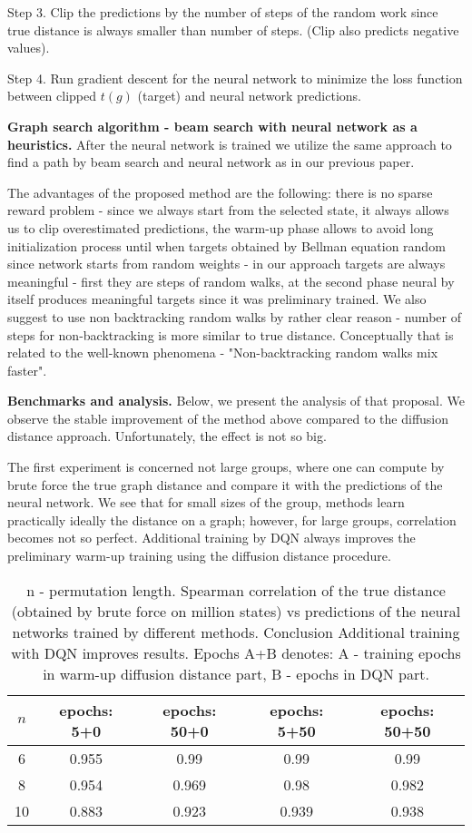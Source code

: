 \documentclass[atmp]{ipart_v1}
\numberwithin{equation}{section}
\theoremstyle{plain}%
\begin{document}
Step 3. Clip the predictions by the number of steps of the random work since true distance is always smaller than number of steps. (Clip also predicts negative values). 

Step 4. Run gradient descent for the neural network to minimize the loss function between clipped $t(g)$ (target) and neural network predictions. 

{\bf Graph search algorithm - beam search with neural network as a heuristics. } After the neural network is trained we utilize the same approach to find a path by beam search and neural network as in our previous paper.


The advantages of the proposed method are the following: there is no sparse reward problem - since we always start from the selected state, it always allows us to clip overestimated predictions, the warm-up phase allows to avoid long initialization process until when targets obtained by Bellman equation random since network starts from random weights - in our approach targets are always meaningful - first they are steps of random walks, at the second phase neural by itself produces meaningful targets since it was preliminary trained. We also suggest to use non backtracking random walks by rather clear reason - number of steps for non-backtracking is more similar to true distance. Conceptually that is related to the well-known phenomena - "Non-backtracking random walks mix faster"\cite{alon2007non}.

{\bf Benchmarks and analysis.}
Below, we present the analysis of that proposal. 
We observe  the stable improvement of the method above compared to the diffusion distance approach. Unfortunately, the effect is not so big.  

The first experiment is concerned not large groups, where one can compute by brute force the true graph distance and compare it with the predictions of the neural network. We see that for small sizes of the group, methods learn practically ideally the distance on a graph; however, for large groups, correlation becomes not so perfect. Additional training by DQN always improves the preliminary warm-up training using the diffusion distance procedure. 


\begin{table}[h]
  \centering
  \begin{tabular}{|c|c|c|c|c|}
  \hline
  $n$  & epochs: 5+0  & epochs: 50+0 & epochs: 5+50 & epochs: 50+50  \\
  \hline
  6 &  0.955 & 0.99  & 0.99  & 0.99 \\
  8 &  0.954 & 0.969 & 0.98 & 0.982 \\
  10 & 0.883  & 0.923 & 0.939 &  0.938 \\
  \hline
  \end{tabular}
  \captionsetup{skip=10pt} 
  \caption{n - permutation length. Spearman correlation of the true distance (obtained by brute force on million states) vs predictions of the neural networks trained by different methods. Conclusion Additional training with DQN improves results. Epochs A+B denotes: A - training epochs in warm-up diffusion distance part, B - epochs in DQN part.  }
  \label{tab:example}
\end{table}
\end{document}

